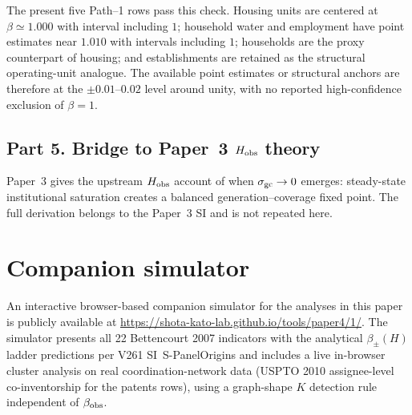 The present five Path--1 rows pass this check. Housing units are centered at \(\beta\simeq 1.000\) with interval including \(1\); household water and employment have point estimates near \(1.010\) with intervals including \(1\); households are the proxy counterpart of housing; and establishments are retained as the structural operating-unit analogue. The available point estimates or structural anchors are therefore at the \(\pm 0.01\)--\(0.02\) level around unity, with no reported high-confidence exclusion of \(\beta=1\).

\subsection*{Part 5. Bridge to Paper~3 \(H_{\rm obs}\) theory}

Paper~3 gives the upstream \(H_{\rm obs}\) account of when \(\sigma_{\rm gc}\to 0\) emerges: steady-state institutional saturation creates a balanced generation--coverage fixed point. The full derivation belongs to the Paper~3 SI and is not repeated here.


\bigskip
\section*{Companion simulator}
An interactive browser-based companion simulator for the analyses in this paper is publicly available at \url{https://shota-kato-lab.github.io/tools/paper4/1/}. The simulator presents all 22 Bettencourt 2007 indicators with the analytical \(\beta_{\pm}(H)\) ladder predictions per V261 SI~\textsf{S-PanelOrigins} and includes a live in-browser cluster analysis on real coordination-network data (USPTO 2010 assignee-level co-inventorship for the patents rows), using a graph-shape \(K\) detection rule independent of \(\beta_{\rm obs}\).


